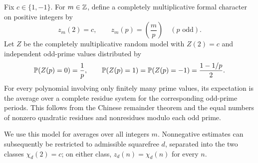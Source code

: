 Fix \(c\in\{1,-1\}\). For \(m\in\mathbb Z\), define a completely multiplicative
formal character on positive integers by
\[
 z_m(2)=c,\qquad z_m(p)=\left(\frac mp\right)
 \quad(p\text{ odd}).
\]
Let \(Z\) be the completely multiplicative random model with \(Z(2)=c\)
and independent odd-prime values distributed by
\begin{equation}\label{eq:setup-model}
 \mathbb P(Z(p)=0)=\frac1p,\qquad
 \mathbb P(Z(p)=1)=\mathbb P(Z(p)=-1)=\frac{1-1/p}{2}.
\end{equation}
For every polynomial involving only finitely many prime values,
its expectation is the average over a complete residue system for the
corresponding odd-prime periods. This follows from the Chinese remainder
theorem and the equal numbers of nonzero quadratic residues and
nonresidues modulo each odd prime.

We use this model for averages over all integers \(m\).
Nonnegative estimates can subsequently be restricted to admissible
squarefree \(d\), separated into the two classes \(\chi_d(2)=c\);
on either class, \(z_d(n)=\chi_d(n)\) for every \(n\).
